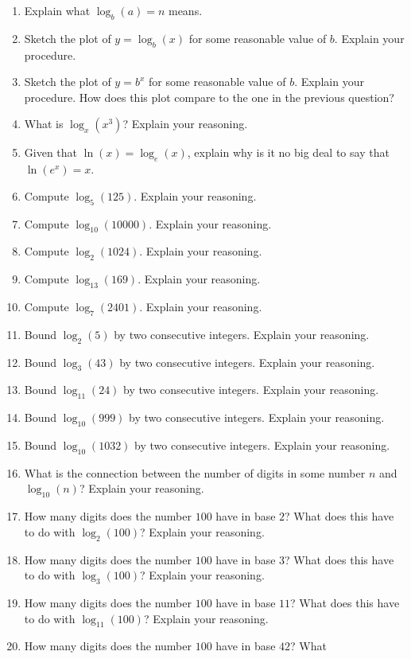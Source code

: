 \begin{problems}
\begin{enumerate}
\item Explain what $\log_b(a) = n$ means.
\item Sketch the plot of $y=\log_b(x)$ for some reasonable value of
  $b$. Explain your procedure.
\item Sketch the plot of $y=b^x$ for some reasonable value of
  $b$. Explain your procedure. How does this plot compare to the one
  in the previous question?
\item What is $\log_x(x^3)$? Explain your reasoning.
\item Given that $\ln(x) = \log_e(x)$, explain why is it no big deal
  to say that $\ln(e^x) = x$.
\item Compute $\log_{5}(125)$. Explain your reasoning.
\item Compute $\log_{10}(10000)$. Explain your reasoning.
\item Compute $\log_2(1024)$. Explain your reasoning.
\item Compute $\log_{13}(169)$. Explain your reasoning.
\item Compute $\log_{7}(2401)$. Explain your reasoning.
\item Bound $\log_{2}(5)$ by two consecutive integers. Explain your reasoning.
\item Bound $\log_{3}(43)$ by two consecutive integers. Explain your reasoning.
\item Bound $\log_{11}(24)$ by two consecutive integers. Explain your
  reasoning.
\item Bound $\log_{10}(999)$ by two consecutive integers. Explain your
  reasoning.
\item Bound $\log_{10}(1032)$ by two consecutive integers. Explain
  your reasoning.
\item What is the connection between the number of digits in some
  number $n$ and $\log_{10}(n)$? Explain your reasoning.
\item How many digits does the number $100$ have in base $2$? What
  does this have to do with $\log_2(100)$? Explain your reasoning.
\item How many digits does the number $100$ have in base $3$? What
  does this have to do with $\log_3(100)$? Explain your reasoning.
\item How many digits does the number $100$ have in base $11$? What
  does this have to do with $\log_{11}(100)$? Explain your reasoning.
\item How many digits does the number $100$ have in base $42$? What

\end{enumerate}
\end{problems}
